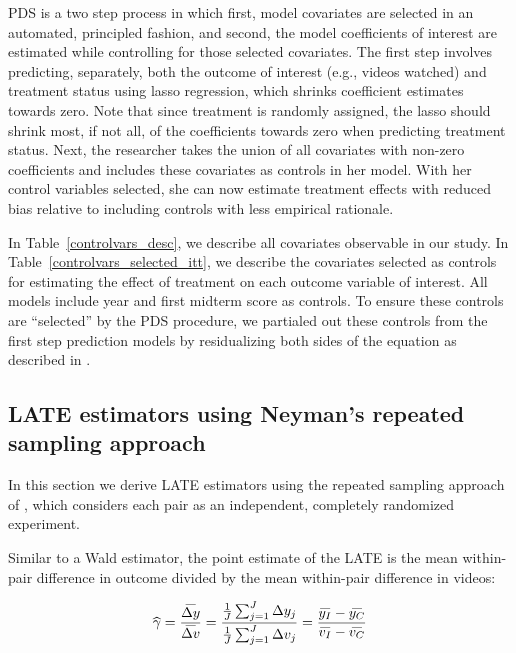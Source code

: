 \documentclass[12pt]{article}
\newcommand\wh[1]{\hstretch{2}{\hat{\hstretch{.5}{#1}}}}
\newcommand\wb[1]{\hstretch{2}{\bar{\hstretch{.5}{#1}}}}
\begin{document}
PDS is a two step process in which first, model covariates are selected in an automated, principled fashion, and second, the model coefficients of interest are estimated while controlling for those selected covariates.
The first step involves predicting, separately, both the outcome of interest (e.g., videos watched) and treatment status using lasso regression, which shrinks coefficient estimates towards zero.
Note that since treatment is randomly assigned, the lasso should shrink most, if not all, of the coefficients towards zero when predicting treatment status.
Next, the researcher takes the union of all covariates with non-zero coefficients and includes these covariates as controls in her model.
With her control variables selected, she can now estimate treatment effects with reduced bias relative to including controls with less empirical rationale.

In Table~\ref{controlvars_desc}, we describe all covariates observable in our study.
In Table~\ref{controlvars_selected_itt}, we describe the covariates selected as controls for estimating the effect of treatment on each outcome variable of interest.
All models include year and first midterm score as controls.
To ensure these controls are ``selected'' by the PDS procedure, we partialed out these controls from the first step prediction models by residualizing both sides of the equation as described in \textcite{bch2014b}.


\subsection{LATE estimators using Neyman's repeated sampling approach} \label{subsec:a_neyman_late}

In this section we derive LATE estimators using the repeated sampling approach of \textcite{neyman1923}, which considers each pair as an independent, completely randomized experiment.

Similar to a Wald estimator, the point estimate of the LATE is the mean within-pair difference in outcome divided by the mean within-pair difference in videos:

\begin{equation} \label{eq:neyman_late_spec}
	\wh{\gamma} = \frac{\wb{\Delta y}}{\wb{\Delta v}} = \frac{\frac{1}{J}\sum_{j=1}^{J} \Delta y_j }{\frac{1}{J}\sum_{j=1}^{J} \Delta v_j} = \frac{\wb{y_I} - \wb{y_C}}{\wb{v_I} - \wb{v_C}}
\end{equation}
\end{document}
